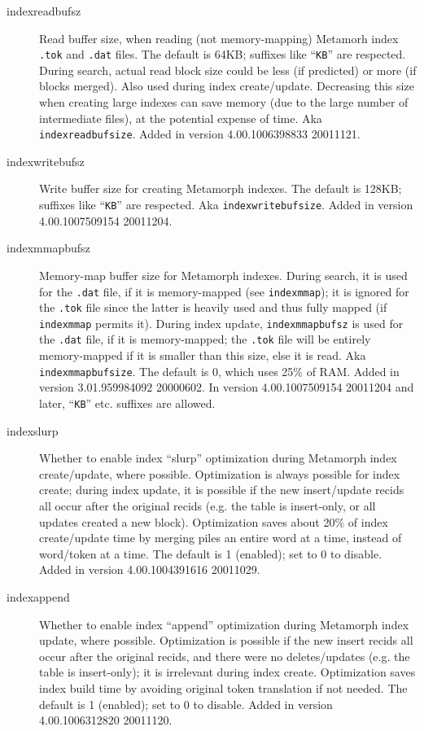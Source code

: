 \begin{description}
\item[indexreadbufsz] Read buffer size, when reading (not
memory-mapping) Metamorh index \verb`.tok` and \verb`.dat` files.  The
default is 64KB; suffixes like ``\verb`KB`'' are respected.  During
search, actual read block size could be less (if predicted) or more
(if blocks merged).  Also used during index create/update.  Decreasing
this size when creating large indexes can save memory (due to the
large number of intermediate files), at the potential expense of time.
Aka \verb`indexreadbufsize`.  Added in version 4.00.1006398833
20011121.

\item[indexwritebufsz] Write buffer size for creating Metamorph
indexes.  The default is 128KB; suffixes like ``\verb`KB`'' are
respected.  Aka \verb`indexwritebufsize`.  Added in version
4.00.1007509154 20011204.

\item[indexmmapbufsz] Memory-map buffer size for Metamorph indexes.
During search, it is used for the \verb`.dat` file, if it is
memory-mapped (see \verb`indexmmap`); it is ignored for the
\verb`.tok` file since the latter is heavily used and thus fully
mapped (if \verb`indexmmap` permits it).  During index update,
\verb`indexmmapbufsz` is used for the \verb`.dat` file, if it is
memory-mapped; the \verb`.tok` file will be entirely memory-mapped if
it is smaller than this size, else it is read.  Aka
\verb`indexmmapbufsize`.  The default is 0, which uses 25\% of RAM.
Added in version 3.01.959984092 20000602.  In version 4.00.1007509154
20011204 and later, ``\verb`KB`'' etc. suffixes are allowed.

\item[indexslurp] Whether to enable index ``slurp'' optimization
during Metamorph index create/update, where possible.  Optimization is
always possible for index create; during index update, it is possible
if the new insert/update recids all occur after the original recids
(e.g. the table is insert-only, or all updates created a new block).
Optimization saves about 20\% of index create/update time by merging
piles an entire word at a time, instead of word/token at a time.  The
default is 1 (enabled); set to 0 to disable.  Added in version
4.00.1004391616 20011029.

\item[indexappend] Whether to enable index ``append'' optimization
during Metamorph index update, where possible.  Optimization is
possible if the new insert recids all occur after the original recids,
and there were no deletes/updates (e.g. the table is insert-only); it
is irrelevant during index create.  Optimization saves index build
time by avoiding original token translation if not needed.  The
default is 1 (enabled); set to 0 to disable.  Added in version
4.00.1006312820 20011120.


\end{description}
